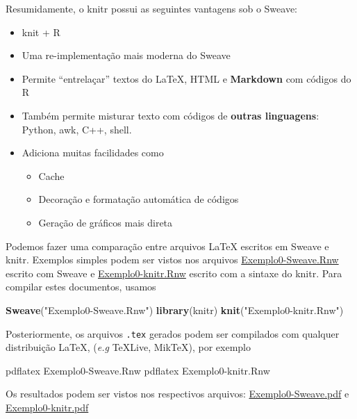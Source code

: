 \documentclass[10pt,a4paper]{book}
\newenvironment{Shaded}{\begin{snugshade}}{\end{snugshade}}
\newcommand{\KeywordTok}[1]{\textcolor[rgb]{0.13,0.29,0.53}{\textbf{#1}}}
\newcommand{\StringTok}[1]{\textcolor[rgb]{0.31,0.60,0.02}{#1}}
\newcommand{\ExtensionTok}[1]{#1}
\newcommand{\NormalTok}[1]{#1}
\providecommand{\tightlist}{%
  \setlength{\itemsep}{0pt}\setlength{\parskip}{0pt}}
\begin{document}
Resumidamente, o knitr possui as seguintes vantagens sob o Sweave:

\begin{itemize}
\tightlist
\item
  knit + R
\item
  Uma re-implementação mais moderna do Sweave
\item
  Permite ``entrelaçar'' textos do LaTeX, HTML e \textbf{Markdown} com
  códigos do R
\item
  Também permite misturar texto com códigos de \textbf{outras
  linguagens}: Python, awk, C++, shell.
\item
  Adiciona muitas facilidades como

  \begin{itemize}
  \tightlist
  \item
    Cache
  \item
    Decoração e formatação automática de códigos
  \item
    Geração de gráficos mais direta
  \end{itemize}
\end{itemize}

Podemos fazer uma comparação entre arquivos LaTeX escritos em Sweave e
knitr. Exemplos simples podem ser vistos nos arquivos
\href{exemplos/Exemplo0-Sweave.Rnw}{Exemplo0-Sweave.Rnw} escrito com
Sweave e \href{exemplos/Exemplo0-knitr.Rnw}{Exemplo0-knitr.Rnw} escrito
com a sintaxe do knitr. Para compilar estes documentos, usamos

\begin{Shaded}
\begin{Highlighting}[]
\KeywordTok{Sweave}\NormalTok{(}\StringTok{"Exemplo0-Sweave.Rnw"}\NormalTok{)}
\KeywordTok{library}\NormalTok{(knitr)}
\KeywordTok{knit}\NormalTok{(}\StringTok{"Exemplo0-knitr.Rnw"}\NormalTok{)}
\end{Highlighting}
\end{Shaded}

Posteriormente, os arquivos \texttt{.tex} gerados podem ser compilados
com qualquer distribuição LaTeX, (\emph{e.g} TeXLive, MikTeX), por
exemplo

\begin{Shaded}
\begin{Highlighting}[]
\ExtensionTok{pdflatex}\NormalTok{ Exemplo0-Sweave.Rnw}
\ExtensionTok{pdflatex}\NormalTok{ Exemplo0-knitr.Rnw}
\end{Highlighting}
\end{Shaded}

Os resultados podem ser vistos nos respectivos arquivos:
\href{exemplos/Exemplo0-Sweave.pdf}{Exemplo0-Sweave.pdf} e
\href{exemplos/Exemplo0-knitr.pdf}{Exemplo0-knitr.pdf}
\end{document}

